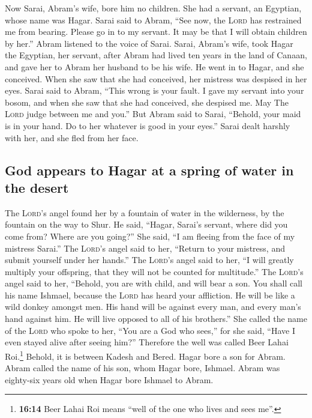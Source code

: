  Now Sarai, Abram's wife, bore him no children. She had a
servant, an Egyptian, whose name was Hagar.  Sarai said to
Abram, ``See now, the \textsc{Lord} has restrained me from bearing.
Please go in to my servant. It may be that I will obtain children by
her.'' Abram listened to the voice of Sarai.  Sarai,
Abram's wife, took Hagar the Egyptian, her servant, after Abram had
lived ten years in the land of Canaan, and gave her to Abram her husband
to be his wife.  He went in to Hagar, and she conceived.
When she saw that she had conceived, her mistress was despised in her
eyes.  Sarai said to Abram, ``This wrong is your fault. I
gave my servant into your bosom, and when she saw that she had
conceived, she despised me. May The \textsc{Lord} judge between me and
you.''  But Abram said to Sarai, ``Behold, your maid is in
your hand. Do to her whatever is good in your eyes.'' Sarai dealt
harshly with her, and she fled from her face.

\hypertarget{god-appears-to-hagar-at-a-spring-of-water-in-the-desert}{%
\subsection{God appears to Hagar at a spring of water in the
desert}\label{god-appears-to-hagar-at-a-spring-of-water-in-the-desert}}

 The \textsc{Lord}'s angel found her by a fountain of
water in the wilderness, by the fountain on the way to Shur.
 He said, ``Hagar, Sarai's servant, where did you come
from? Where are you going?'' She said, ``I am fleeing from the face of
my mistress Sarai.''  The \textsc{Lord}'s angel said to
her, ``Return to your mistress, and submit yourself under her hands.''
 The \textsc{Lord}'s angel said to her, ``I will greatly
multiply your offspring, that they will not be counted for multitude.''
 The \textsc{Lord}'s angel said to her, ``Behold, you are
with child, and will bear a son. You shall call his name Ishmael,
because the \textsc{Lord} has heard your affliction.  He
will be like a wild donkey amongst men. His hand will be against every
man, and every man's hand against him. He will live opposed to all of
his brothers.''  She called the name of the \textsc{Lord}
who spoke to her, ``You are a God who sees,'' for she said, ``Have I
even stayed alive after seeing him?''  Therefore the well
was called Beer Lahai Roi.\footnote{\textbf{16:14} Beer Lahai Roi means
  ``well of the one who lives and sees me''.} Behold, it is between
Kadesh and Bered.  Hagar bore a son for Abram. Abram
called the name of his son, whom Hagar bore, Ishmael. 
Abram was eighty-six years old when Hagar bore Ishmael to Abram.

